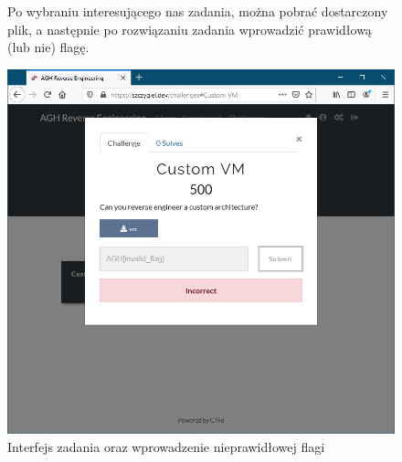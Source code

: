 \documentclass[polish,12pt]{aghthesis}
\begin{document}
\begin{figure}[ht]
Po wybraniu interesującego nas zadania, można pobrać dostarczony plik,
    a następnie po rozwiązaniu zadania wprowadzić prawidłową (lub nie) flagę.

    \vspace{1cm}

    \centering
    \includegraphics[width=14cm]{szczygiel_dev_incorrect}
    \caption{Interfejs zadania oraz wprowadzenie nieprawidłowej flagi}
    \label{fig:szczygiel_dev_incorrect}
\end{figure}
\end{document}
